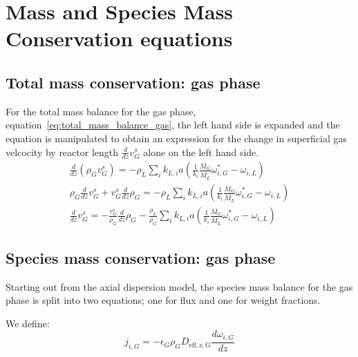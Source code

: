 \documentclass{article}
\begin{document}
\section{Mass and Species Mass Conservation equations}

\subsection{Total mass conservation: gas phase}

For the total mass balance for the gas phase, equation~\ref{eq:total_mass_balance_gas}, the left hand side is expanded and the equation is manipulated to obtain an expression for the change in superficial gas velcocity by reactor length $\frac{d}{dz}v_G^s$ alone on the left hand side.
\begin{equation}
	\begin{split}
	\frac{d}{dz}\left(\rho_Gv_G^s\right) =-\rho_L\sum_ik_{L,i}a(\frac{1}{k_i}\frac{\overline{M_G}}{\overline{M_L}}\omega_{i,G}^*-\omega_{i,L})\\
	\rho_G\frac{d}{dz}v_G^s + v_G^s\frac{d}{dz}\rho_G =-\rho_L\sum_ik_{L,i}a(\frac{1}{k_i}\frac{\overline{M_G}}{\overline{M_L}}\omega_{i,G}^*-\omega_{i,L})\\
	\frac{d}{dz}v_G^s = -\frac{v_G^s}{\rho_G}\frac{d}{dz}\rho_G - \frac{\rho_L}{\rho_G}\sum_ik_{L,i}a(\frac{1}{k_i}\frac{\overline{M_G}}{\overline{M_L}}\omega_{i,G}^*-\omega_{i,L})
	\label{eq:total_balance_gas_manipulations}
	\end{split}
\end{equation}

\subsection{Species mass conservation: gas phase}
Starting out from the axial dispersion model, the species mass balance for the gas phase is split into two equations; one for flux and one for weight fractions.

We define:
\begin{equation}
	j_{i,G} = - \epsilon_G \rho_G D_{\mathrm{eff,z,G}}\frac{d\omega_{i,G}}{dz}
\end{equation}
\end{document}
